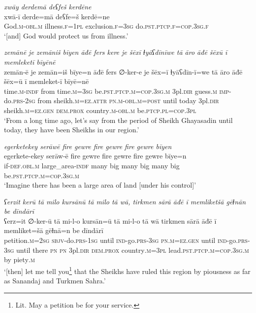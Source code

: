 \ea \label{DG.7}
\textit{xwāy derdemā deʕfeš kerdēne} \\ 
\gll xwā-ī derde=mā deʕfe=š kerdē=ne \\ 
 God\textsc{.m}\textsc{-obl}\textsc{.m} illness\textsc{\textsc{.f}}\textsc{=1pl} exclusion\textsc{\textsc{.f}}\textsc{=3sg} do\textsc{.pst}\textsc{.ptcp}\textsc{\textsc{.f}}\textsc{=cop}\textsc{.3sg}\textsc{\textsc{.f}} \\ 
\glt `[and] God would protect us from illness.'
\z 
 
\ea \label{DG.8}
\textit{zemānē je zemāniš bīyen āđē fers kere je šēxī ɫyāʕdīnīwe tā āro āđē šēxū ī memleketī bīyēnē} \\ 
\gll zemān-ē je zemān=iš bīye=n āđē fers ∅-ker-e je šēx=ī ɫyāʕdīn-ī=we tā āro āđē šēx=ū ī memleket-ī bīyē=nē \\ 
 time\textsc{.m}\textsc{-indf} from time\textsc{.m}\textsc{=3sg} be\textsc{.pst}\textsc{.ptcp}\textsc{.m}\textsc{=cop}\textsc{.3sg}\textsc{.m} 3pl\textsc{.dir} guess\textsc{.m} \textsc{imp-}do\textsc{.prs}-\textsc{2sg} from sheikh\textsc{.m}\textsc{=ez}.\textsc{attr} \textsc{pn}\textsc{.m}\textsc{-obl}\textsc{.m}\textsc{=\textsc{post}} until today 3pl\textsc{.dir} sheikh\textsc{.m}\textsc{=ez}\textsc{.gen} \textsc{dem.prox} country\textsc{.m}\textsc{-obl}\textsc{.m} be\textsc{.ptcp}\textsc{.pl}\textsc{=cop}\textsc{.3pl} \\ 
\glt `From a long time ago, let’s say from the period of Sheikh Ghayasadin until today, they have been Sheikhs in our region.'
\z 
 
\ea \label{DG.9}
\textit{egerketekey serāwē fire gewre fire gewre fire gewre bīyen} \\ 
\gll egerkete-ekey serāw-ē fire gewre fire gewre fire gewre bīye=n \\ 
 if\textsc{-def}\textsc{.obl}\textsc{.m} large\_area\textsc{-indf} many big many big many big be\textsc{.pst}\textsc{.ptcp}\textsc{.m}\textsc{=cop}\textsc{.3sg}\textsc{.m} \\ 
\glt `Imagine there has been a large area of land [under his control]'
\z 
 
\ea \label{DG.10}
\textit{ʕerzit kerū tā milo kursānū tā milo tā wā, tirkmen sārā āđē ī memliketšā gēɫnān be dīndārī} \\ 
\gll ʕerz=it ∅-ker-ū tā mi-l-o kursān=ū tā mi-l-o tā wā tirkmen sārā āđē ī memliket=šā gēɫnā=n be dīndārī \\ 
 petition\textsc{.m}\textsc{=\textsc{2sg}} \textsc{sbjv-}do\textsc{.prs}\textsc{-1sg} until \textsc{ind-}go\textsc{.prs}\textsc{-3sg} \textsc{pn}\textsc{.m}\textsc{=ez}\textsc{.gen} until \textsc{ind-}go\textsc{.prs}\textsc{-3sg} until there \textsc{pn} \textsc{pn} 3pl\textsc{.dir} \textsc{dem.prox} country\textsc{.m}\textsc{=3pl} lead\textsc{.pst}\textsc{.ptcp}\textsc{.m}\textsc{=cop}\textsc{.3sg}\textsc{.m} by piety\textsc{.m} \\ 
\glt `[then] let me tell you\footnote{Lit. May a petition be for your service.} that the Sheikhs have ruled this region by piousness as far as Sanandaj and Turkmen Sahra.'
\z 
 
